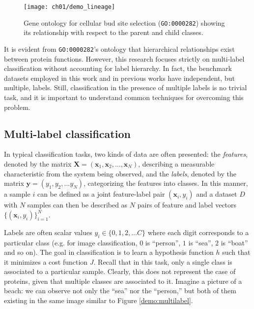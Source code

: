 \begin{figure}[!t]
  \centering
  \texttt{[image: ch01/demo\_lineage]}
  \caption[Gene ontology for \texttt{GO:0000282} or "cellular bud site selection"]{
      Gene ontology for cellular bud site selection (\texttt{GO:0000282})
      showing its relationship with respect to the parent and child classes.
  }
  \label{demo:yeast_go}
\end{figure}

\par It is evident from \texttt{GO:0000282}'s ontology that hierarchical
relationships exist between protein functions. However, this research focuses
strictly on multi-label classification without accounting for label
hierarchy. In fact, the benchmark datasets employed in this work and in previous 
works have independent, but multiple, labels. Still, classification in the presence
of multiple labels is no trivial task, and it is important to understand common 
techniques for overcoming this problem. 

\subsection{Multi-label classification}

\par In typical classification tasks, two kinds of data are often presented:
the \textit{features}, denoted by the matrix $\mathbf{X} =
(\mathbf{x}_{1}, \mathbf{x}_{2}, \dots, \mathbf{x}_{N})$, describing
a measurable characteristic from the system being observed, and the
\textit{labels}, denoted by the matrix $\mathbf{y} = (y_{1}, y_{2}, \dots
y_{N})$, categorizing the features into classes. In this manner, a sample $i$
can be defined as a joint feature-label pair $(\mathbf{x}_{i}, y_{i})$ and a dataset
$D$ with $N$ samples can then be described as $N$ pairs of feature
and label vectors  $\{(\mathbf{x}_{i}, y_{i})\}_{i=1}^{N}$.

\par Labels are often scalar values $y_{i} \in \{0, 1, 2, \dots
C\}$ where each digit corresponds to a particular class (e.g. for image
classification, $0$ is ``person'', $1$ is ``sea'', $2$ is ``boat'' and so on). The
goal in classification is to learn a hypothesis function $h$ such that
it minimizes a cost function $J$. Recall that in this task, only a single class
is associated to a particular sample. Clearly, this does not represent the case of
proteins, given that multiple classes are associated to it. Imagine a picture of
a beach: we can observe not only the ``sea'' nor the ``person,'' but both of
them existing in the same image similar to Figure \ref{demo:multilabel}.

